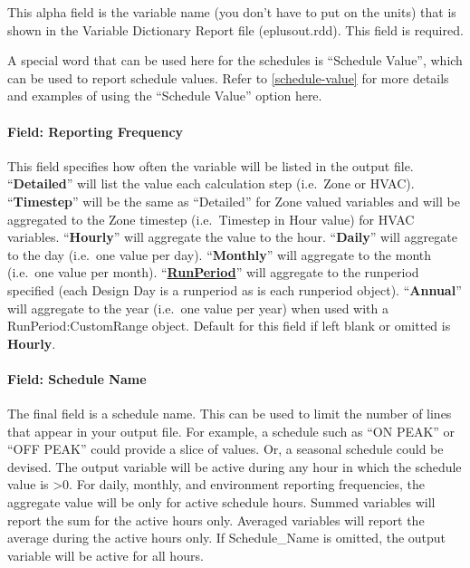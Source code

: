 This alpha field is the variable name (you don't have to put on the units) that is shown in the Variable Dictionary Report file (eplusout.rdd). This field is required.

A special word that can be used here for the schedules is ``Schedule Value'', which can be used to report schedule values. Refer to \ref{schedule-value} for more details and examples of using the ``Schedule Value'' option here.

\paragraph{Field: Reporting Frequency}\label{field-reporting-frequency}

This field specifies how often the variable will be listed in the output file. ``\textbf{Detailed}'' will list the value each calculation step (i.e.~Zone or HVAC). ``\textbf{Timestep}'' will be the same as ``Detailed'' for Zone valued variables and will be aggregated to the Zone timestep (i.e.~Timestep in Hour value) for HVAC variables. ``\textbf{Hourly}'' will aggregate the value to the hour. ``\textbf{Daily}'' will aggregate to the day (i.e.~one value per day). ``\textbf{Monthly}'' will aggregate to the month (i.e.~one value per month). ``\textbf{\hyperref[runperiod]{RunPeriod}}'' will aggregate to the runperiod specified (each Design Day is a runperiod as is each runperiod object). ``\textbf{Annual}'' will aggregate to the year  (i.e.~one value per year) when used with a RunPeriod:CustomRange object. Default for this field if left blank or omitted is \textbf{Hourly}.

\paragraph{Field: Schedule Name}\label{field-schedule-name-004}

The final field is a schedule name. This can be used to limit the number of lines that appear in your output file. For example, a schedule such as ``ON PEAK'' or ``OFF PEAK'' could provide a slice of values. Or, a seasonal schedule could be devised. The output variable will be active during any hour in which the schedule value is \textgreater{}0. For daily, monthly, and environment reporting frequencies, the aggregate value will be only for active schedule hours. Summed variables will report the sum for the active hours only. Averaged variables will report the average during the active hours only. If Schedule\_Name is omitted, the output variable will be active for all hours.

